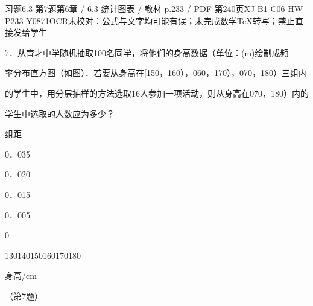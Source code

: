 \begin{bankitem}{习题6.3 第7题}{第6章 / 6.3 统计图表 / 教材 p.233 / PDF 第240页}{XJ-B1-C06-HW-P233-Y0871}{OCR未校对：公式与文字均可能有误；未完成数学TeX转写；禁止直接发给学生}
\begin{ocrdraft}
\par
7．从育才中学随机抽取100名同学，将他们的身高数据（单位：(m)绘制成频
\par
率分布直方图（如图）．若要从身高在[150，160），060，170），070，180）三组内
\par
的学生中，用分层抽样的方法选取16人参加一项活动，则从身高在070，180）内的
\par
学生中选取的人数应为多少？
\par
组距
\par
0．035
\par
0．020
\par
0．015
\par
0．005
\par
0
\par
130140150160170180
\par
身高/cm
\par
（第7题）
\end{ocrdraft}
\end{bankitem}
